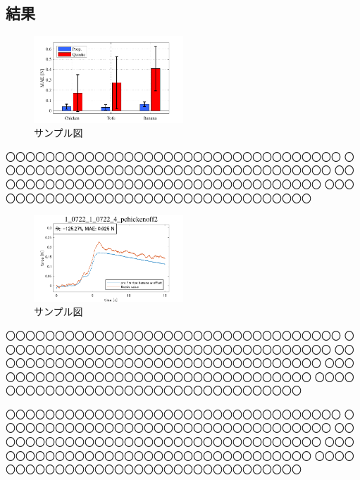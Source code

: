 \documentclass[a4paper]{jarticle}
\begin{document}
\subsection{結果}
\begin{figure}[htbp]
    \centering
    \includegraphics[width=0.5\textwidth]{bar_result.pdf}
    \caption{サンプル図}
    \label{fig:bar_result}
\end{figure}
〇〇〇〇〇〇〇〇〇〇〇〇〇〇〇〇〇〇〇〇〇〇〇〇〇〇〇〇〇〇〇〇〇〇
〇〇〇〇〇〇〇〇〇〇〇〇〇〇〇〇〇〇〇〇〇〇〇〇〇〇〇〇〇〇〇〇〇〇
〇〇〇〇〇〇〇〇〇〇〇〇〇〇〇〇〇〇〇〇〇〇〇〇〇〇〇〇〇〇〇〇〇〇
〇〇〇〇〇〇〇〇〇〇〇〇〇〇〇〇〇〇〇〇〇〇〇〇〇〇〇〇〇〇〇〇〇〇
\begin{figure}[htbp]
    \centering
    \includegraphics[width=0.5\textwidth]{test.pdf}
    \caption{サンプル図}
    \label{fig:twst}
\end{figure}
〇〇〇〇〇〇〇〇〇〇〇〇〇〇〇〇〇〇〇〇〇〇〇〇〇〇〇〇〇〇〇〇〇〇
〇〇〇〇〇〇〇〇〇〇〇〇〇〇〇〇〇〇〇〇〇〇〇〇〇〇〇〇〇〇〇〇〇〇
〇〇〇〇〇〇〇〇〇〇〇〇〇〇〇〇〇〇〇〇〇〇〇〇〇〇〇〇〇〇〇〇〇〇
〇〇〇〇〇〇〇〇〇〇〇〇〇〇〇〇〇〇〇〇〇〇〇〇〇〇〇〇〇〇〇〇〇〇
〇〇〇〇〇〇〇〇〇〇〇〇〇〇〇〇〇〇〇〇〇〇〇〇〇〇〇〇〇〇〇〇〇〇

〇〇〇〇〇〇〇〇〇〇〇〇〇〇〇〇〇〇〇〇〇〇〇〇〇〇〇〇〇〇〇〇〇〇
〇〇〇〇〇〇〇〇〇〇〇〇〇〇〇〇〇〇〇〇〇〇〇〇〇〇〇〇〇〇〇〇〇〇
〇〇〇〇〇〇〇〇〇〇〇〇〇〇〇〇〇〇〇〇〇〇〇〇〇〇〇〇〇〇〇〇〇〇
〇〇〇〇〇〇〇〇〇〇〇〇〇〇〇〇〇〇〇〇〇〇〇〇〇〇〇〇〇〇〇〇〇〇
〇〇〇〇〇〇〇〇〇〇〇〇〇〇〇〇〇〇〇〇〇〇〇〇〇〇〇〇〇〇〇〇〇〇
\end{document}
